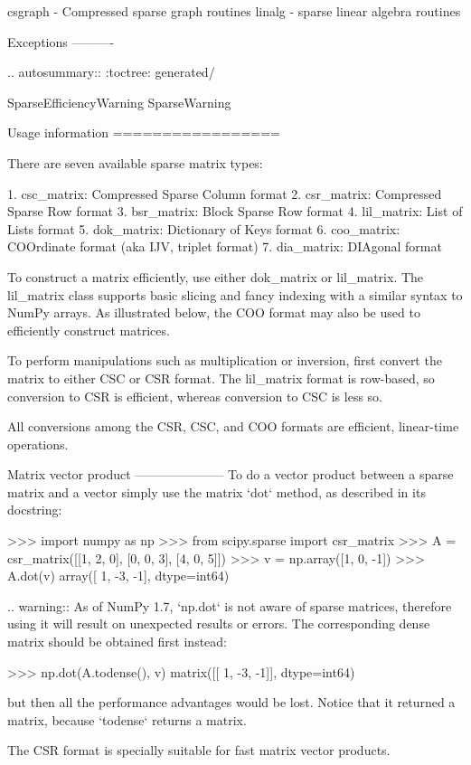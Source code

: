 \begin{DoxyVerb}
   csgraph - Compressed sparse graph routines
   linalg - sparse linear algebra routines

Exceptions
----------

.. autosummary::
   :toctree: generated/

   SparseEfficiencyWarning
   SparseWarning


Usage information
=================

There are seven available sparse matrix types:

1. csc_matrix: Compressed Sparse Column format
2. csr_matrix: Compressed Sparse Row format
3. bsr_matrix: Block Sparse Row format
4. lil_matrix: List of Lists format
5. dok_matrix: Dictionary of Keys format
6. coo_matrix: COOrdinate format (aka IJV, triplet format)
7. dia_matrix: DIAgonal format

To construct a matrix efficiently, use either dok_matrix or lil_matrix.
The lil_matrix class supports basic slicing and fancy
indexing with a similar syntax to NumPy arrays.  As illustrated below,
the COO format may also be used to efficiently construct matrices.

To perform manipulations such as multiplication or inversion, first
convert the matrix to either CSC or CSR format. The lil_matrix format is
row-based, so conversion to CSR is efficient, whereas conversion to CSC
is less so.

All conversions among the CSR, CSC, and COO formats are efficient,
linear-time operations.

Matrix vector product
---------------------
To do a vector product between a sparse matrix and a vector simply use
the matrix `dot` method, as described in its docstring:

>>> import numpy as np
>>> from scipy.sparse import csr_matrix
>>> A = csr_matrix([[1, 2, 0], [0, 0, 3], [4, 0, 5]])
>>> v = np.array([1, 0, -1])
>>> A.dot(v)
array([ 1, -3, -1], dtype=int64)

.. warning:: As of NumPy 1.7, `np.dot` is not aware of sparse matrices,
  therefore using it will result on unexpected results or errors.
  The corresponding dense matrix should be obtained first instead:

  >>> np.dot(A.todense(), v)
  matrix([[ 1, -3, -1]], dtype=int64)

  but then all the performance advantages would be lost.
  Notice that it returned a matrix, because `todense` returns a matrix.

The CSR format is specially suitable for fast matrix vector products.


\end{DoxyVerb}
